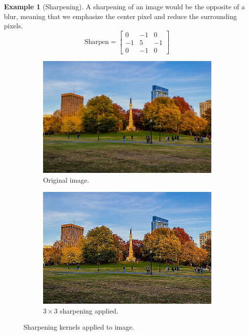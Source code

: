 \documentclass{article}
\theoremstyle{definition}
\newtheorem{example}{Example}[section]
\theoremstyle{remark}
\theoremstyle{definition}
\begin{document}
\begin{example}[Sharpening]
A sharpening of an image would be the opposite of a blur, meaning that we emphasize the center pixel and reduce the surrounding pixels. 
\[\text{Sharpen} = \begin{bmatrix} 0 & -1 & 0 \\ -1 & 5 & -1 \\ 0 & -1 & 0 \end{bmatrix}\]
\begin{figure}[hbt!]
    \centering
    \begin{subfigure}[b]{0.45\textwidth}
    \centering
        \includegraphics[width=\textwidth]{Images/OpenCV/Park_Full.png}
        \caption{Original image. }
        \label{fig:original_image_2}
    \end{subfigure}
    \begin{subfigure}[b]{0.45\textwidth}
    \centering
        \includegraphics[width=\textwidth]{Images/OpenCV/Sharpen.png}
        \caption{$3 \times 3$ sharpening applied. }
        \label{fig:sharpened_image}
    \end{subfigure}

    \label{fig:sharpen}
    \caption{Sharpening kernels applied to image. }
\end{figure}
\end{example}
\end{document}
